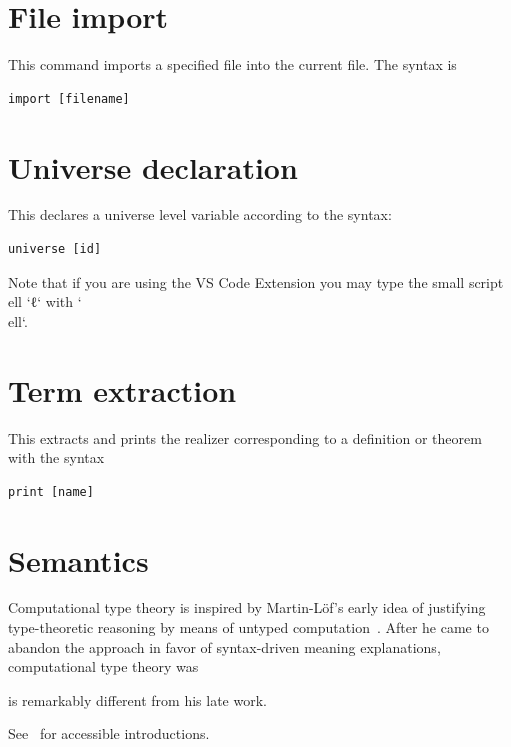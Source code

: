 \documentclass[a4paper]{article}
\begin{document}
\section{File import}

This command imports a specified file into the current file. The syntax is 

\begin{lstlisting}[style=pearl]
import [filename]
\end{lstlisting}

\section{Universe declaration }

This declares a universe level variable according to the syntax:

\begin{lstlisting}[style=pearl]
universe [id]
\end{lstlisting}

Note that if you are using the VS Code Extension you may type the small script ell `ℓ` with `\\ell`.

\section{Term extraction} 

This extracts and prints the realizer corresponding to a definition or theorem with the syntax 

\begin{lstlisting}[style=pearl]
print [name]
\end{lstlisting}

\section{Semantics}

Computational type theory is inspired by Martin-Löf's early idea of justifying type-theoretic reasoning by means of untyped computation~\cite{martinlof1982constructive}. After he came to abandon the approach in favor of syntax-driven meaning explanations, computational type theory was

is remarkably different from his late work.

See~\cite{constable2009computational,sterling2015typetheory} for accessible introductions. 





\end{document}
